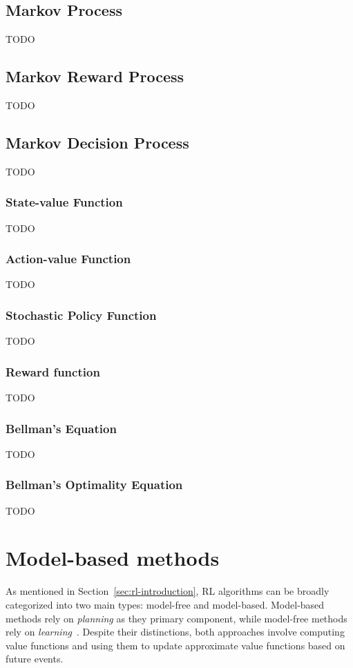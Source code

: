 \documentclass[../chapters.tex]{subfiles}
\begin{document}
    \subsection{Markov Process}\label{subsec:markov-process}
    TODO

    \subsection{Markov Reward Process}\label{subsec:markov-reward-process}
    TODO

    \subsection{Markov Decision Process}\label{subsec:markov-decision-process}
    TODO

    \subsubsection{State-value Function}\label{subsubsec:state-value-function}
    TODO

    \subsubsection{Action-value Function}\label{subsubsec:action-value-function}
    TODO

    \subsubsection{Stochastic Policy Function}\label{subsubsec:stochastic-policy-function}
    TODO

    \subsubsection{Reward function}\label{subsubsec:reward-function}
    TODO

    \subsubsection{Bellman's Equation}\label{subsec:bellman-equation}
    TODO

    \subsubsection{Bellman's Optimality Equation}\label{subsec:bellman-optimality-equation}
    TODO


    \section{Model-based methods}
    As mentioned in Section~\ref{sec:rl-introduction}, RL algorithms can be broadly categorized into two main types: model-free and model-based.
    Model-based methods rely on \emph{planning} as they primary component, while model-free methods rely on \emph{learning}~\cite{sutton2018reinforcement}.
    Despite their distinctions, both approaches involve computing value functions and using them to update approximate value functions based on future events.
\end{document}
